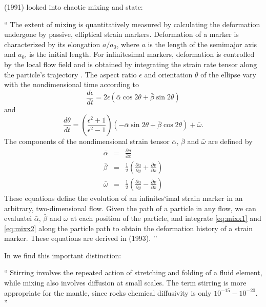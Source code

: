\textcite{kest91} (1991) looked into chaotic mixing and state:
\begin{displayquote}
{\color{darkgray}
``
The extent of mixing is quantitatively measured by 
calculating the deformation undergone by passive, elliptical
strain markers. Deformation of a marker is characterized by
its elongation $a/a_0$, where $a$ is the length of the semimajor
axis and $a_0$, is the initial length. For infinitesimal markers,
deformation is controlled by the local flow field and is 
obtained by integrating the strain rate tensor along the particle's 
trajectory \cite{ketu90}. The aspect ratio $\epsilon$ and orientation $\theta$ 
of the ellipse vary with the nondimensional time according to
\begin{equation}
\frac{d\epsilon}{dt}=2 \epsilon (\bar{\alpha} \cos 2\theta + \bar{\beta} \sin 2\theta)
\label{eq:mixx1}
\end{equation}
and
\begin{equation}
\frac{d\theta}{dt}=\left(\frac{\epsilon^2 +1}{\epsilon^2-1} \right)
(-\bar{\alpha} \sin 2\theta + \bar{\beta} \cos 2\theta) + \bar{\omega}.
\label{eq:mixx2}
\end{equation}
The components of the nondimensional strain tensor $\bar{\alpha}$,
$\bar{\beta}$ and $\bar{\omega}$ are defined by
\begin{eqnarray}
\bar{\alpha} &=& \frac{\partial u}{\partial x} \\
\bar{\beta}  &=& \frac12\left( \frac{\partial u}{\partial y}+\frac{\partial v}{\partial x}\right)\\
\bar{\omega} &=& \frac12\left( \frac{\partial u}{\partial y}-\frac{\partial v}{\partial x}\right)
\end{eqnarray}
These equations define the evolution of an infinites`imal
strain marker in an arbitrary, two-dimensional flow. Given
the path of a particle in any flow, we can evaluatei
$\bar{\alpha}$, $\bar{\beta}$ and $\bar{\omega}$
at each position of the particle, and integrate \eqref{eq:mixx1} and \eqref{eq:mixx2}
along the particle path to obtain the deformation history of a
strain marker.
These equations are derived in \textcite{kell93} (1993).
''
}
\end{displayquote}

In \textcite{fasa03} we find this important distinction:
\begin{displayquote}
{\color{darkgray}
``
Stirring involves the repeated action of stretching 
and folding of a fluid element, while mixing
also involves diffusion at small scales. The
term stirring is more appropriate for the mantle,
since rocks chemical diffusivity is only $10^{-15}-10^{-20}$.
''
}
\end{displayquote}



